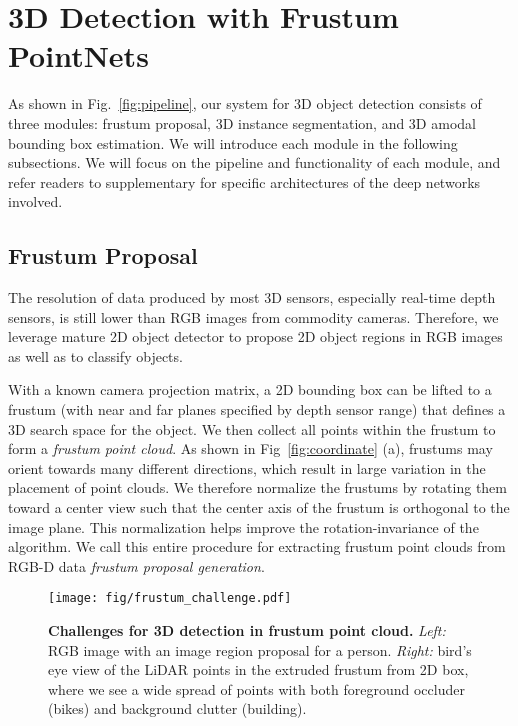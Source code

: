 \documentclass[10pt,twocolumn,letterpaper]{article}
\begin{document}
\section{3D Detection with Frustum PointNets}
As shown in Fig.~\ref{fig:pipeline}, our system for 3D object detection consists of three modules: frustum proposal, 3D instance segmentation, and 3D amodal bounding box estimation. We will introduce each module in the following subsections. We will focus on the pipeline and functionality of each module, and refer readers to supplementary for specific architectures of the deep networks involved.


\subsection{Frustum Proposal}
\label{sec:frustum_proposal}


The resolution of data produced by most 3D sensors, especially real-time depth sensors, is still lower than RGB images from commodity cameras. Therefore, we leverage mature 2D object detector to propose 2D object regions in RGB images as well as to classify objects.

With a known camera projection matrix, a 2D bounding box can be lifted to a frustum (with near and far planes specified by depth sensor range) that defines a 3D search space for the object. We then collect all points within the frustum to form a \emph{frustum point cloud}. As shown in Fig~\ref{fig:coordinate} (a), frustums may orient towards many different directions, which result in large variation in the placement of point clouds.  We therefore normalize the frustums by rotating them toward a center view such that the center axis of the frustum is orthogonal to the image plane. This normalization helps improve the rotation-invariance of the algorithm. We call this entire procedure for extracting frustum point clouds from RGB-D data \emph{frustum proposal generation}.


\begin{figure}[b!]
    \centering
    \texttt{[image: fig/frustum\_challenge.pdf]}
    \caption{\textbf{Challenges for 3D detection in frustum point cloud.} \emph{Left:} RGB image with an image region proposal for a person. \emph{Right:} bird's eye view of the LiDAR points in the extruded frustum from 2D box, where we see a wide spread of points with both foreground occluder (bikes) and background clutter (building).}
    \label{fig:frustum}
\end{figure}
\end{document}
